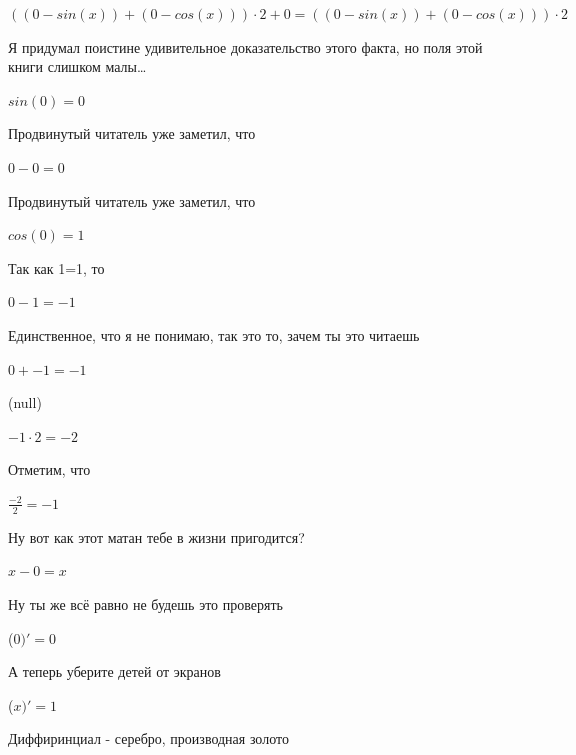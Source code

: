 \documentclass[12pt,a4paper,fleqn]{article}
\begin{document}
\begin{center}
\begin{center}
\begin{center}
\begin{center}
\begin{center}
\begin{center}
\begin{center}
\begin{center}
\begin{center}
\begin{center}
\begin{center}
$((0-sin(x))+(0-cos(x))) \cdot 2+0 = ((0-sin(x))+(0-cos(x))) \cdot 2$\end{center}
Я придумал поистине удивительное доказательство этого факта, но поля этой книги слишком малы\ldots

\begin{center}
\begin{center}$sin(0) = 0$\end{center}
Продвинутый читатель уже заметил, что

\begin{center}
\begin{center}$0-0 = 0$\end{center}
Продвинутый читатель уже заметил, что

\begin{center}
\begin{center}$cos(0) = 1$\end{center}
Так как 1=1, то\cite{link4}

\begin{center}
\begin{center}$0-1 = -1$\end{center}
Единственное, что я не понимаю, так это то, зачем ты это читаешь

\begin{center}
\begin{center}$0+-1 = -1$\end{center}
(null)\cite{link4}

\begin{center}
\begin{center}$-1 \cdot 2 = -2$\end{center}
Отметим, что

\begin{center}
\begin{center}$\frac{-2}{2} = -1$\end{center}
Ну вот как этот матан тебе в жизни пригодится?

\begin{center}
$x-0 = x$\end{center}
Ну ты же всё равно не будешь это проверять

\begin{center}
 ($0)'
  = 0$\end{center}
А теперь уберите детей от экранов

\begin{center}
 ($x)'
  = 1$\end{center}
Диффиринциал - серебро, производная золото\cite{link2}


\end{center}
\end{center}
\end{center}
\end{center}
\end{center}
\end{center}
\end{center}
\end{center}
\end{center}
\end{center}
\end{center}
\end{center}
\end{center}
\end{center}
\end{center}
\end{center}
\end{center}
\end{document}
